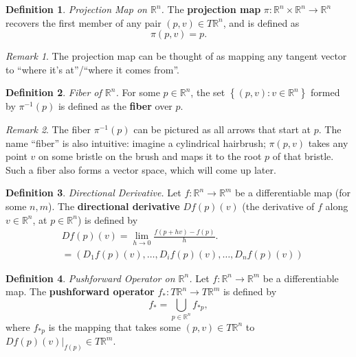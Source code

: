 \documentclass[10pt,landscape]{article}
\theoremstyle{definition}
\newtheorem{definition}{Definition}[section]
\theoremstyle{theorem}
\theoremstyle{summary}
\theoremstyle{remark}
\newtheorem*{remark}{Remark}
\newcommand{\R}{\mathbb{R}}
\newcommand{\Rn}{\mathbb{R}^n}
\begin{document}
\begin{multicols*}{3}
\theoremstyle{definition}
\begin{definition}{\textit{Projection Map on $\Rn$.}}
The \textbf{projection map} $\pi:\Rn\times\Rn\rightarrow\Rn$ recovers the first member of any pair $(p, v)\in T\Rn$, and is defined as
\begin{equation}
    \pi(p, v) = p.
\end{equation}
\end{definition}

\begin{remark}
The projection map can be thought of as mapping any tangent vector to ``where it's at''/``where it comes from''.
\end{remark}

\theoremstyle{definition}
\begin{definition}{\textit{Fiber of $\Rn$.}}
For some $p\in\Rn$, the set $\left\{(p,v) : v\in\Rn\right\}$ formed by $\pi^{-1}(p)$ is defined as the \textbf{fiber} over $p$.
\end{definition}

\begin{remark}
The fiber $\pi^{-1}(p)$ can be pictured as all arrows that start at $p$. The name ``fiber'' is also intuitive: imagine a cylindrical hairbrush; $\pi (p,v)$ takes any point $v$ on some bristle on the brush and maps it to the root $p$ of that bristle. Such a fiber also forms a vector space, which will come up later.
\end{remark}

\theoremstyle{definition}
\begin{definition}{\textit{Directional Derivative.}}
Let $f:\Rn\rightarrow\R^m$ be a differentiable map (for some $n, m$). The \textbf{directional derivative} $Df(p)(v)$ (the derivative of $f$ along $v\in\Rn$, at $p\in\Rn$) is defined by
\begin{align}
    &Df(p)(v) = \lim_{h\rightarrow 0} \frac{f(p+hv) - f(p)}{h}. \\
    &= \left(D_1f(p)(v), \ldots, D_if(p)(v), \ldots ,D_nf(p)(v)\right)
\end{align}


\end{definition}

\theoremstyle{definition}
\begin{definition}{\textit{Pushforward Operator on $\Rn$.}}
Let $f:\Rn\rightarrow\R^m$ be a differentiable map. The \textbf{pushforward operator} $f_*:T\Rn\rightarrow T\mathbb{R}^m$ is defined by
\begin{equation}
    f_*=\bigcup_{p\in\Rn}f_{*p},
\end{equation}
where $f_{*p}$ is the mapping that takes some $(p, v)\in T\Rn$ to $\left.Df(p)(v)\right|_{f(p)}\in T\R^m$.
\end{definition}


\end{multicols*}
\end{document}

